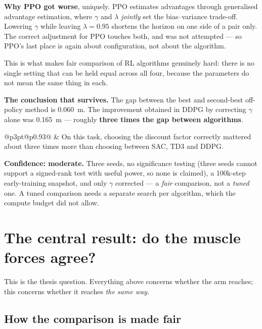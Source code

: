 \begin{why}
\textbf{Why PPO got worse}, uniquely. PPO estimates advantages through
generalised advantage estimation, where $\gamma$ and $\lambda$ \emph{jointly} set
the bias--variance trade-off. Lowering $\gamma$ while leaving $\lambda = 0.95$
shortens the horizon on one side of a pair only. The correct adjustment for PPO
touches both, and was not attempted --- so PPO's last place is again about
configuration, not about the algorithm.

This is what makes fair comparison of RL algorithms genuinely hard: there is no
single setting that can be held equal across all four, because the parameters do
not mean the same thing in each.
\end{why}

\textbf{The conclusion that survives.} The gap between the best and second-best
off-policy method is \SI{0.060}{\meter}. The improvement obtained in DDPG by
correcting $\gamma$ alone was \SI{0.165}{\meter} --- roughly \textbf{three times
the gap between algorithms}.

\begin{center}
\begin{tabular}{@{}p{3pt}@{\hspace{10pt}}p{0.93\linewidth}@{}}
 & On this task, choosing the discount factor correctly mattered
about three times more than choosing between SAC, TD3 and DDPG.
\end{tabular}
\end{center}

\textbf{Confidence: moderate.} Three seeds, no significance testing (three seeds
cannot support a signed-rank test with useful power, so none is claimed), a
100k-step early-training snapshot, and only $\gamma$ corrected --- a \emph{fair}
comparison, not a \emph{tuned} one. A tuned comparison needs a separate search
per algorithm, which the compute budget did not allow.

\section{The central result: do the muscle forces agree?}

This is the thesis question. Everything above concerns whether the arm reaches;
this concerns whether it reaches \emph{the same way}.

\subsection{How the comparison is made fair}

